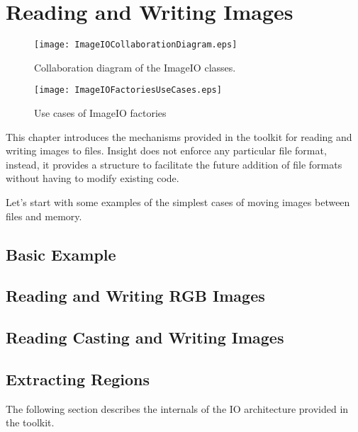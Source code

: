 

\chapter{Reading and Writing Images}
\label{sec:IO}

\begin{figure}
\center
\texttt{[image: ImageIOCollaborationDiagram.eps]}
\caption{Collaboration diagram of the ImageIO classes.}
\label{fig:ImageIOCollaborationDiagram}
\end{figure}

\begin{figure}
\center
\texttt{[image: ImageIOFactoriesUseCases.eps]}
\caption{Use cases of ImageIO factories}
\label{fig:ImageIOFactoriesUseCases}
\end{figure}


This chapter introduces the mechanisms provided in the toolkit for reading and
writing images to files. Insight does not enforce any particular file format,
instead, it provides a structure to facilitate the future addition of file
formats without having to modify existing code. 

Let's start with some examples of the simplest cases of moving images between files
and memory.

\section{Basic Example}
\label{sec:ImagReadWrite}


\section{Reading and Writing RGB Images}
\label{sec:RGBImagReadWrite}


\section{Reading Casting and Writing Images}
\label{sec:ImagReadCastWrite}


\section{Extracting Regions}
\label{sec:ImagReadExtractWrite}



The following section describes the internals of the IO architecture provided
in the toolkit.

